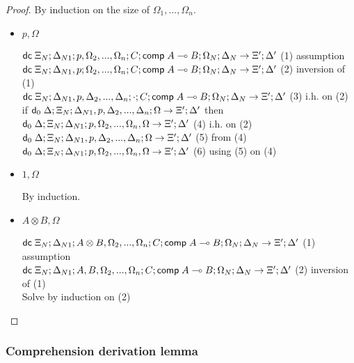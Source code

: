 \begin{proof}
   By induction on the size of $\Omega_1, ..., \Omega_n$.
   
   \begin{itemize}
      \item $p, \Omega$
      
      $\mathsf{dc} \; \Xi_N; \Delta_{N1}; p, \Omega_2, ..., \Omega_n; C; \mathsf{comp} \; A \multimap B; \Omega_N; \Delta_N \rightarrow \Xi'; \Delta'$ \hfill (1) assumption \\
      $\mathsf{dc} \; \Xi_N; \Delta_{N1}, p; \Omega_2, ..., \Omega_n; C; \mathsf{comp} \; A \multimap B; \Omega_N; \Delta_N \rightarrow \Xi'; \Delta'$ \hfill (2) inversion of (1) \\
      $\mathsf{dc} \; \Xi_N; \Delta_{N1}, p, \Delta_2, ..., \Delta_n; \cdot; C; \mathsf{comp} \; A \multimap B; \Omega_N; \Delta_N \rightarrow \Xi'; \Delta'$ \hfill (3) i.h. on (2) \\
      if $\mathsf{d}_0 \; \Delta; \Xi_N; \Delta_{N1}, p, \Delta_2, ..., \Delta_n; \Omega \rightarrow \Xi'; \Delta'$ then $\mathsf{d}_0 \; \Delta; \Xi_N; \Delta_{N1}; p, \Omega_2, ..., \Omega_n, \Omega \rightarrow \Xi'; \Delta'$ \hfill (4) i.h. on (2) \\
      $\mathsf{d}_0 \; \Delta; \Xi_N; \Delta_{N1}, p, \Delta_2, ..., \Delta_n; \Omega \rightarrow \Xi'; \Delta'$ \hfill (5) from (4) \\
      $\mathsf{d}_0 \; \Delta; \Xi_N; \Delta_{N1}; p, \Omega_2, ..., \Omega_n, \Omega \rightarrow \Xi'; \Delta'$ \hfill (6) using (5) on (4) \\
      
      \item $1, \Omega$
      
      By induction.
      
      \item $A \otimes B, \Omega$
      
      $\mathsf{dc} \; \Xi_N; \Delta_{N1}; A \otimes B, \Omega_2, ..., \Omega_n; C; \mathsf{comp} \; A \multimap B; \Omega_N; \Delta_N \rightarrow \Xi'; \Delta'$ \hfill (1) assumption \\
      $\mathsf{dc} \; \Xi_N; \Delta_{N1}; A, B, \Omega_2, ..., \Omega_n; C; \mathsf{comp} \; A \multimap B; \Omega_N; \Delta_N \rightarrow \Xi'; \Delta'$ \hfill (2) inversion of (1) \\
      Solve by induction on (2) \\
   \end{itemize}
\end{proof}

\subsubsection{Comprehension derivation lemma}

